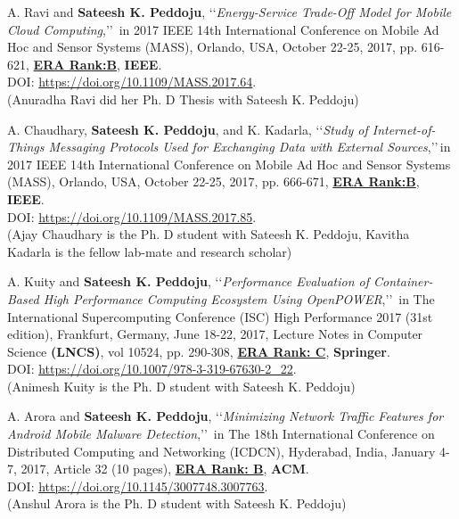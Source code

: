 \begin{etaremune}
	
	\item
	A. Ravi and \textbf{Sateesh K. Peddoju}, \lq\lq \textit{Energy-Service Trade-Off Model for Mobile Cloud Computing},\rq\rq\, in 2017 IEEE 14th International Conference on Mobile Ad Hoc and Sensor Systems (MASS), Orlando, USA, October 22-25, 2017, pp. 616-621, \underline{\textbf{ERA Rank:B}}, \textbf{IEEE}. \\DOI: \url{https://doi.org/10.1109/MASS.2017.64}. \\(Anuradha Ravi did her Ph. D Thesis with Sateesh K. Peddoju)

	
		\item
	A. Chaudhary, \textbf{Sateesh K. Peddoju}, and K. Kadarla, \lq\lq \textit{Study of Internet-of-Things Messaging Protocols Used for Exchanging Data with External Sources},\rq\rq\,in 2017 IEEE 14th International Conference on Mobile Ad Hoc and Sensor Systems (MASS), Orlando, USA, October 22-25, 2017, pp. 666-671, \underline{\textbf{ERA Rank:B}}, \textbf{IEEE}. \\DOI: \url{https://doi.org/10.1109/MASS.2017.85}. \\(Ajay Chaudhary is the Ph. D student with Sateesh K. Peddoju, Kavitha Kadarla is the fellow lab-mate and research scholar)

	
	\item
	A. Kuity and \textbf{Sateesh K. Peddoju}, \lq\lq \textit{Performance Evaluation of Container-Based High Performance Computing Ecosystem Using OpenPOWER},\rq\rq\, in The International Supercomputing Conference (ISC) High Performance 2017 (31st edition), Frankfurt, Germany, June 18-22, 2017, Lecture Notes in Computer Science \textbf{(LNCS)}, vol 10524, pp. 290-308,  \underline{\textbf{ERA Rank: C}}, \textbf{Springer}. \\DOI: \url{https://doi.org/10.1007/978-3-319-67630-2_22}. \\(Animesh Kuity is the Ph. D student with Sateesh K. Peddoju)

	
	\item
	A. Arora and \textbf{Sateesh K. Peddoju}, \lq\lq \textit{Minimizing Network Traffic Features for Android Mobile Malware Detection},\rq\rq\, in The 18th International Conference on Distributed Computing and Networking (ICDCN), Hyderabad, India, January 4-7, 2017, Article 32 (10 pages), \underline{\textbf{ERA Rank: B}}, \textbf{ACM}.  \\DOI: \url{https://doi.org/10.1145/3007748.3007763}. \\ (Anshul Arora is the Ph. D student with Sateesh K. Peddoju)


\end{etaremune}

